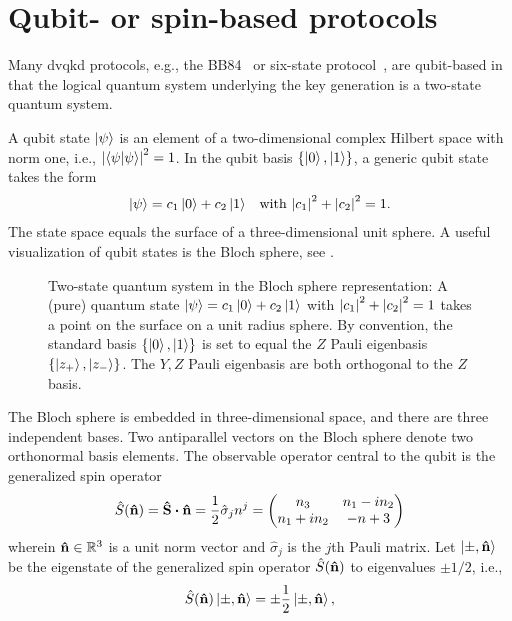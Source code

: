 \section{Qubit- or spin-based protocols}

Many \gls{dvqkd} protocols, e.g., the BB84~\cite{Bennett1984} or six-state protocol~\cite{Bechmann1999}, are qubit-based in that the logical quantum system underlying the key generation is a two-state quantum system.

A qubit state $\ket{\psi}$ is an element of a two-dimensional complex Hilbert space with norm one, i.e., $\abs{\braket{\psi}}^2=1$.
In the qubit basis $\{\ket{0},\ket{1}\}$, a generic qubit state takes the form
\begin{align}
	\ket{\psi}
	=
	c_1\ket{0}
	+
	c_2\ket{1}
	&&
	\text{with}\
	\abs{c_1}^2
	+
	\abs{c_2}^2
	=
	1
	.
\end{align}
The state space equals the surface of a three-dimensional unit sphere.
A useful visualization of qubit states is the Bloch sphere, see .
\begin{figure}[htb]
	\centering
	
	\caption{Two-state quantum system in the Bloch sphere representation: A (pure) quantum state  $\ket{\psi}=c_1\ket{0}+c_2\ket{1}$ with $\abs{c_1}^2+\abs{c_2}^2=1$ takes a point on the surface on a unit radius sphere. By convention, the standard basis $\left\{\ket{0},\ket{1}\right\}$ is set to equal the $Z$ Pauli eigenbasis $\left\{\ket{z_+},\ket{z_-}\right\}$. The $Y,Z$ Pauli eigenbasis are both orthogonal to the $Z$ basis.}\label{fig:bloch_sphere}
\end{figure}
The Bloch sphere is embedded in three-dimensional space, and there are three independent bases.
Two antiparallel vectors on the Bloch sphere denote two orthonormal basis elements.
The observable operator central to the qubit is the generalized spin operator
\begin{equation}
	\hat{S}(\vu{n})
	=
	\vb{\hat{S}}\vdot\vu{n}
	=
	\frac{1}{2}
	\hat{\sigma}_jn^j
	=
	\begin{pmatrix}
		n_3 & n_1 - in_2 \\
		n_1 + in_2 & -n+3
	\end{pmatrix}
\end{equation}
wherein $\vu{n}\in\mathbb{R}^3$ is a unit norm vector and $\hat{\sigma}_j$ is the $j$th Pauli matrix.
Let $\ket{\pm,\vu{n}}$ be the eigenstate of the generalized spin operator $\hat{S}(\vu{n})$ to eigenvalues $\pm1/2$, i.e.,
\begin{equation}
	\hat{S}(\vu{n})
	\ket{\pm,\vu{n}}
	=
	\pm\frac{1}{2}
	\ket{\pm,\vu{n}},
\end{equation}

